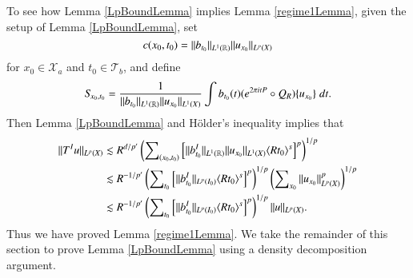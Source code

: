 To see how Lemma \ref{LpBoundLemma} implies Lemma \ref{regime1Lemma}, given the setup of Lemma \ref{LpBoundLemma}, set 
%
\begin{equation}
    c(x_0,t_0) = \| b_{t_0} \|_{L^1(\operatorname{\mathbb{R}})} \| u_{x_0} \|_{L^p(X)}
\end{equation}
%
for $x_0 \in \mathcal{X}_{a}$ and $t_0 \in \mathcal{T}_{b}$, and define
%
\begin{equation}
    S\!_{x_0,t_0} = \frac{1}{\| b_{t_0} \|_{L^1(\operatorname{\mathbb{R}})} \| u_{x_0} \|_{L^1(X)}} \int b_{t_0}(t) ( e^{2 \pi i t P} \circ Q_R ) \{ u_{x_0} \}\; dt.
\end{equation}
%
Then Lemma \ref{LpBoundLemma} and H\"{o}lder's inequality implies that
%
\begin{equation}
\begin{split}
    \| T^I u \|_{L^p(X)} &\lesssim R^{d/p'} \left( \sum\nolimits_{(x_0,t_0)} \left[ \| b_{t_0}^I \|_{L^1(\operatorname{\mathbb{R}})} \| u_{x_0} \|_{L^1(X)} \langle R t_0 \rangle^{s} \right]^p \right)^{1/p}\\
    &\lesssim R^{-1/p'} \left( \sum\nolimits_{t_0} \Big[ \| b_{t_0}^I \|_{L^p(I_0)} \langle R t_0 \rangle^{s} \Big]^p \right)^{1/p}\left( \sum\nolimits_{x_0} \| u_{x_0} \|_{L^p(X)}^p \right)^{1/p}\\
    &\lesssim R^{-1/p'} \left( \sum\nolimits_{t_0} \Big[ \| b_{t_0}^I \|_{L^p(I_0)} \langle R t_0 \rangle^{s} \Big]^p \right)^{1/p} \| u \|_{L^p(X)}.
\end{split}
\end{equation}
%
Thus we have proved Lemma \ref{regime1Lemma}. We take the remainder of this section to prove Lemma \ref{LpBoundLemma} using a density decomposition argument.


